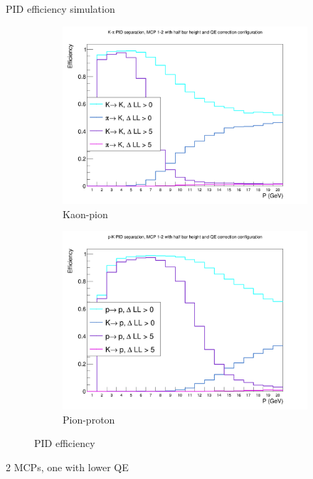 \documentclass{beamer}
\begin{document}
\begin{frame}{PID efficiency simulation}
  \begin{figure}
    \centering
    \vspace{-0.2cm}
    \begin{subfigure}{0.5\textwidth}
      \includegraphics[width = 1.0\textwidth]{Plots/KaonPionPIDEfficiencyStandardMCPAB.png}
      \caption{Kaon-pion}
    \end{subfigure}%
    \begin{subfigure}{0.5\textwidth}
      \includegraphics[width = 1.0\textwidth]{Plots/PionProtonPIDEfficiencyStandardMCPAB.png}
      \caption{Pion-proton}
    \end{subfigure}
    \caption{PID efficiency}
  \end{figure}
  \begin{center}
    2 MCPs, one with lower QE
  \end{center}
\end{frame}
\end{document}
